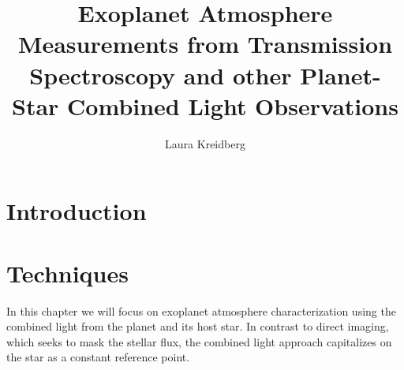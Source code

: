 \documentclass[graybox,natbib,nosecnum]{svmult}
\begin{document}
\title*{Exoplanet Atmosphere Measurements from Transmission Spectroscopy and other Planet-Star Combined Light Observations}
\author{Laura Kreidberg}
%
%
\maketitle




\section{Introduction }



\section{Techniques} 
In this chapter we will focus on exoplanet atmosphere characterization using the combined light from the planet and its host star. In contrast to direct imaging, which seeks to mask the stellar flux, the combined light approach capitalizes on the star as a constant reference point. 
\end{document}

